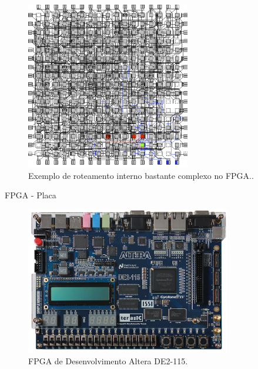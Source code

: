 	\begin{frame}%
		\begin{figure}[p]
			\centering
			\includegraphics[width=0.64\textwidth]{img/fpga/exemploFinal.png}
			\caption{Exemplo de roteamento interno bastante complexo no FPGA..}
			\label{fig:fpgaHardware}
		\end{figure}
	\end{frame}
	\begin{frame}{FPGA - Placa}
		\begin{figure}[p]
			\centering
			\includegraphics[width=0.8\textwidth]{img/fpgaHardware.png}
			\caption{FPGA de Desenvolvimento Altera DE2-115.}
			\label{fig:fpgaHardware}
		\end{figure}
	\end{frame}
